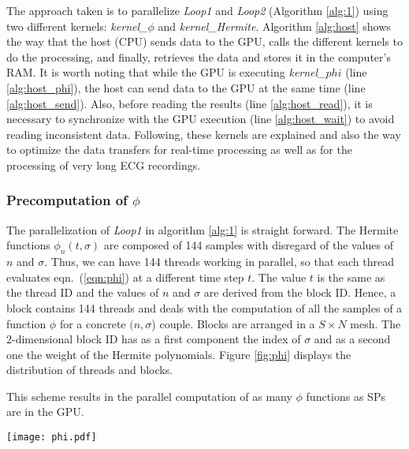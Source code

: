 \documentclass[runningheads]{llncs}
\begin{document}
The approach taken is to parallelize \textit{Loop1} and \textit{Loop2} (Algorithm \ref{alg:1}) using two different kernels: \textit{kernel\_$\phi$} and \textit{kernel\_Hermite}. Algorithm \ref{alg:host} shows the way that the host (CPU) sends data to the GPU, calls the different kernels to do the processing, and finally, retrieves the data and stores it in the computer's RAM. It is worth noting that while the GPU is executing \textit{kernel\_$phi$} (line \ref{alg:host_phi}), the host can send data to the GPU at the same time (line \ref{alg:host_send}). Also, before reading the results (line \ref{alg:host_read}), it is necessary to synchronize with the GPU execution (line \ref{alg:host_wait}) to avoid reading inconsistent data.
Following, these kernels are explained and also the way to optimize the data transfers for real-time processing as well as for the processing of very long ECG recordings.

\subsubsection{Precomputation of $\phi$\\}

The parallelization of \textit{Loop1} in algorithm \ref{alg:1} is straight forward. The Hermite functions $\phi_n(t,\sigma)$ are composed of 144 samples with disregard of the values of $n$ and $\sigma$. Thus, we can have 144 threads working in parallel, so that each thread evaluates eqn.~(\ref{eqn:phi}) at a different time step $t$. The value $t$ is the same as the thread ID and the values of $n$ and $\sigma$ are derived from the block ID. Hence, a block contains 144 threads and deals with the computation of all the samples of a function $\phi$ for a concrete $(n,\sigma$) couple. Blocks are arranged in a $S\times N$ mesh. The 2-dimensional block ID has as a first component the index of  $\sigma$ and as a second one the weight of the Hermite polynomials. Figure \ref{fig:phi} displays the distribution of threads and blocks.

This scheme results in the parallel computation of as many $\phi$ functions as SPs are in the GPU. 

\begin{figure*}\label{fig:phi}
	\centering
		\texttt{[image: phi.pdf]}
	\caption{Thread and block distribution for \textit{kernel\_$\phi$}}
\end{figure*}
\end{document}
